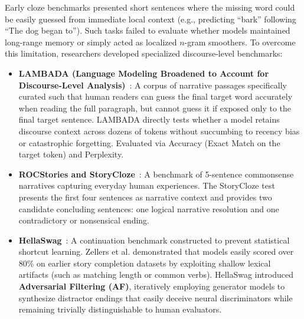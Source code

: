 \documentclass[../../../main.tex]{subfiles}
\begin{document}
Early cloze benchmarks presented short sentences where the missing word could be easily guessed from immediate local context (e.g., predicting ``bark'' following ``The dog began to''). Such tasks failed to evaluate whether models maintained long-range memory or simply acted as localized $n$-gram smoothers. To overcome this limitation, researchers developed specialized discourse-level benchmarks:
\begin{itemize}
    \item \textbf{LAMBADA (Language Modeling Broadened to Account for Discourse-Level Analysis)}~\cite{paperno2016lambada}: A corpus of narrative passages specifically curated such that human readers can guess the final target word accurately when reading the full paragraph, but cannot guess it if exposed only to the final target sentence. LAMBADA directly tests whether a model retains discourse context across dozens of tokens without succumbing to recency bias or catastrophic forgetting. Evaluated via Accuracy (Exact Match on the target token) and Perplexity.
    \item \textbf{ROCStories and StoryCloze}~\cite{mostafazadeh2016rocstories}: A benchmark of 5-sentence commonsense narratives capturing everyday human experiences. The StoryCloze test presents the first four sentences as narrative context and provides two candidate concluding sentences: one logical narrative resolution and one contradictory or nonsensical ending.
    \item \textbf{HellaSwag}~\cite{zellers2019hellaswag}: A continuation benchmark constructed to prevent statistical shortcut learning. Zellers et al. demonstrated that models easily scored over 80\% on earlier story completion datasets by exploiting shallow lexical artifacts (such as matching length or common verbs). HellaSwag introduced \textbf{Adversarial Filtering (AF)}, iteratively employing generator models to synthesize distractor endings that easily deceive neural discriminators while remaining trivially distinguishable to human evaluators.
\end{itemize}
\end{document}
